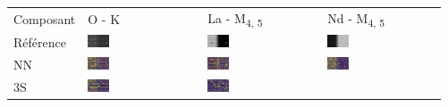 \begin{tabular}{m{}*{3}{M{0.21\textwidth}}}
Composant&O - K&La - M\textsubscript{4, 5}&Nd - M\textsubscript{4, 5}\\
Référence
&\includegraphics[width=0.2\textwidth]{img/chapitre4/figure15/synth_hole/SynthH_GT_band_0.png}
&\includegraphics[width=0.2\textwidth]{img/chapitre4/figure15/synth_hole/SynthH_GT_band_1.png}
&\includegraphics[width=0.2\textwidth]{img/chapitre4/figure15/synth_hole/SynthH_GT_band_2.png}
\\
NN
&\includegraphics[width=0.2\textwidth]{img/chapitre4/figure15/synth_hole/SynthH_interpolation_band_0.png}
&\includegraphics[width=0.2\textwidth]{img/chapitre4/figure15/synth_hole/SynthH_interpolation_band_1.png}
&\includegraphics[width=0.2\textwidth]{img/chapitre4/figure15/synth_hole/SynthH_interpolation_band_2.png}
\\
3S
&\includegraphics[width=0.2\textwidth]{img/chapitre4/figure15/synth_hole/SynthH_3S_band_0.png}
&\includegraphics[width=0.2\textwidth]{img/chapitre4/figure15/synth_hole/SynthH_3S_band_1.png}

\end{tabular}
